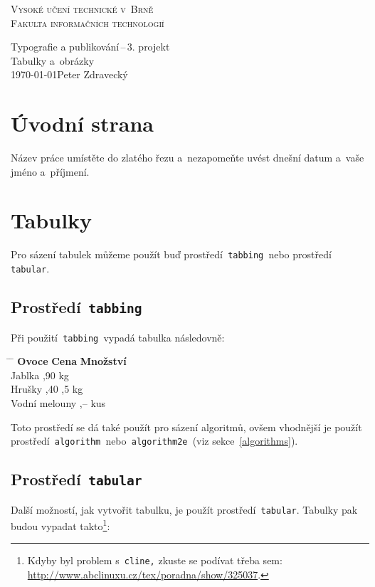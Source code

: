 \documentclass[11pt,a4paper]{article}
\begin{document}
\begin{titlepage}
\begin{center}
    {\Huge{\textsc{Vysoké učení technické v~Brně}}\\}
    {\huge{\textsc{Fakulta informačních technologií}}\\}
    
    {\LARGE{Typografie a publikování\,--\,3. projekt}\\}
    {\Huge{Tabulky a~obrázky}\\}
    {\Large{\today \hfill Peter Zdravecký}}
\end{center}
\end{titlepage}

\section{Úvodní strana}
Název práce umístěte do zlatého řezu a~nezapomeňte uvést dnešní datum a~vaše jméno a~příjmení.

\section{Tabulky}
Pro sázení tabulek můžeme použít buď prostředí\texttt{ tabbing }nebo prostředí\texttt{ tabular}.

\subsection{Prostředí\texttt{ tabbing}}
Při použití\texttt{ tabbing }vypadá tabulka následovně:
\begin{tabbing}
    \hspace{2.75cm} \= \hspace{1.25cm}  \= \hspace{1.25cm}     \kill
	\textbf{Ovoce}  \> \textbf{Cena}    \> \textbf{Množství}    \\
	Jablka		    ,90     kg	    \\
	Hrušky			,40    ,5 kg   \\
	Vodní melouny	,--     kus    \\
\end{tabbing}
Toto prostředí se dá také použít pro sázení algoritmů, ovšem vhodnější je použít
prostředí\texttt{ algorithm }nebo\texttt{ algorithm2e }(viz sekce~\ref{algorithms}).

\subsection{Prostředí\texttt{ tabular}}
Další možností, jak vytvořit tabulku, je použít prostředí\texttt{ tabular}. Tabulky pak budou vypadat takto\footnote{Kdyby byl problem s\texttt{ cline,} zkuste se podívat třeba sem: \href{http://www.abclinuxu.cz/tex/poradna/show/325037}{http://www.abclinuxu.cz/tex/poradna/show/325037}.}:
\end{document}
